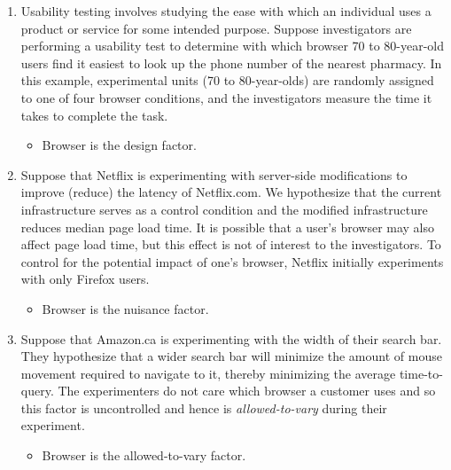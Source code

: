 \begin{enumerate}
    \item Usability testing involves studying the ease with which an individual uses a product or service
          for some intended purpose. Suppose investigators are performing a usability test to determine
          with which browser 70 to 80-year-old users find it easiest to look up the phone number of
          the nearest pharmacy. In this example, experimental units (70 to 80-year-olds) are randomly
          assigned to one of four browser conditions, and the investigators measure the time it
          takes to complete the task.
          \begin{itemize}
              \item Browser is the design factor.
          \end{itemize}
    \item Suppose that Netflix is experimenting with server-side modifications to improve (reduce) the
          latency of Netflix.com. We hypothesize that the current infrastructure serves as a control condition
          and the modified infrastructure reduces median page load time. It is possible
          that a user's browser may also affect page load time, but this effect is not of interest to
          the investigators. To control for the potential impact of one's browser, Netflix initially
          experiments with only Firefox users.
          \begin{itemize}
              \item Browser is the nuisance factor.
          \end{itemize}
    \item Suppose that Amazon.ca is experimenting with the width of their search bar. They hypothesize
          that a wider search bar will minimize the amount of mouse movement required to
          navigate to it, thereby minimizing the average time-to-query. The experimenters do not care
          which browser a customer uses and so this factor is uncontrolled and hence is \emph{allowed-to-vary}
          during their experiment.
          \begin{itemize}
              \item Browser is the allowed-to-vary factor.
          \end{itemize}
\end{enumerate}
